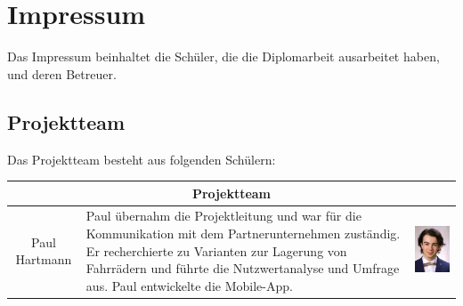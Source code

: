 \section{Impressum}
Das Impressum beinhaltet die Schüler, die die Diplomarbeit ausarbeitet haben, und deren Betreuer.
\subsection{Projektteam}
Das Projektteam besteht aus folgenden Schülern:\\

\begin{table}[H]
  \centering
  \begin{tabular}{cp{}c}
    \multicolumn{3}{c}{\textbf{Projektteam}}                                                                                                                                                                                                                                                                                                                           \\
    \toprule
    Paul Hartmann & Paul übernahm die Projektleitung und war für die Kommunikation mit dem Partnerunternehmen zuständig. Er recherchierte zu Varianten zur Lagerung von Fahrrädern und führte die Nutzwertanalyse und Umfrage aus. Paul entwickelte die Mobile-App.          & \begin{minipage}{.3\textwidth} \includegraphics{images/paulhartmann.jpg} \end{minipage} \\

\end{tabular}
\end{table}
